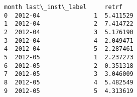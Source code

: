 \documentclass[11pt]{article}
\makeatletter
\newcommand{\boxspacing}{\kern\kvtcb@left@rule\kern\kvtcb@boxsep}
\newcommand{\prompt}[4]{
        {\ttfamily\llap{{\color{#2}[#3]:\hspace{3pt}#4}}\vspace{-\baselineskip}}
    }
\makeatother
\begin{document}
            \begin{tcolorbox}[breakable, size=fbox, boxrule=.5pt, pad at break*=1mm, opacityfill=0]
\prompt{Out}{outcolor}{6}{\boxspacing}
\begin{Verbatim}[commandchars=\\\{\}]
     month last\_inst\_label     retrf
0  2012-04               1  5.411529
1  2012-04               2  7.414722
2  2012-04               3  5.176190
3  2012-04               4  2.049471
4  2012-04               5  2.287461
5  2012-05               1  2.237273
6  2012-05               2  0.351318
7  2012-05               3  3.046009
8  2012-05               4  5.482549
9  2012-05               5  4.313619
\end{Verbatim}
\end{tcolorbox}
        
\end{document}
